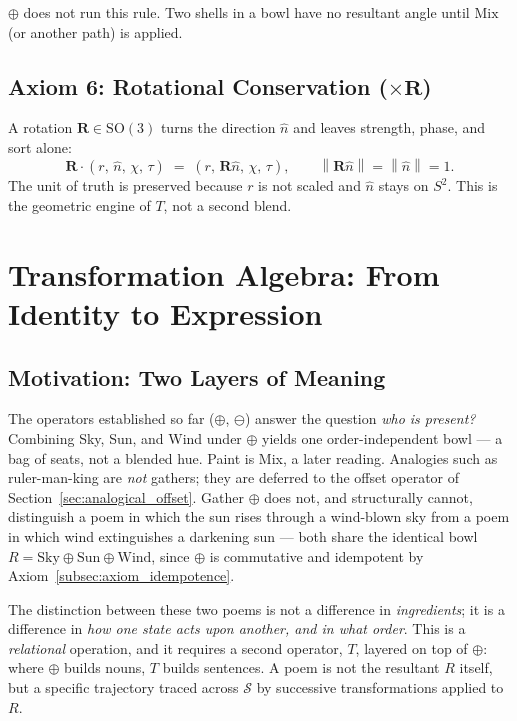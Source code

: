 \documentclass[12pt, a4paper]{article}
\providecommand{\norm}[1]{\left\lVert#1\right\rVert}
\begin{document}
$\oplus$ does not run this rule. Two shells in a bowl have no
resultant angle until $\mathrm{Mix}$ (or another path) is applied.

\subsection{Axiom 6: Rotational Conservation (\texorpdfstring{$\times \mathbf{R}$}{x R})}
\label{subsec:axiom_rotation}
A rotation $\mathbf{R} \in \mathrm{SO}(3)$ turns the direction $\hat n$ and leaves strength, phase, and sort alone:
\begin{equation}
    \mathbf{R}\cdot(r,\,\hat n,\,\chi,\,\tau)
    \;=\;
    (r,\,\mathbf{R}\hat n,\,\chi,\,\tau),
    \qquad
    \norm{\mathbf{R}\hat n} = \norm{\hat n} = 1.
\end{equation}
The unit of truth is preserved because $r$ is not scaled and $\hat n$ stays on $S^2$. This is the geometric engine of $T$, not a second blend.

\section{Transformation Algebra: From Identity to Expression}
\label{sec:transformation_algebra}

\subsection{Motivation: Two Layers of Meaning}
\label{subsec:transform_motivation}
The operators established so far ($\oplus$, $\ominus$) answer the question
\emph{who is present?} Combining Sky, Sun, and Wind under $\oplus$
yields one order-independent bowl --- a bag of seats, not a blended
hue. Paint is Mix, a later reading. Analogies such as ruler-man-king are \emph{not} gathers; they are deferred to the offset operator of Section~\ref{sec:analogical_offset}. Gather $\oplus$ does not, and structurally
cannot, distinguish a poem in which the sun rises through a wind-blown
sky from a poem in which wind extinguishes a darkening sun --- both
share the identical bowl
$R = \text{Sky} \oplus \text{Sun} \oplus \text{Wind}$, since $\oplus$
is commutative and idempotent by Axiom~\ref{subsec:axiom_idempotence}.

The distinction between these two poems is not a difference in
\emph{ingredients}; it is a difference in \emph{how one state acts
upon another, and in what order}. This is a \emph{relational}
operation, and it requires a second operator, $T$, layered on top of
$\oplus$: where $\oplus$ builds nouns, $T$ builds sentences. A poem is
not the resultant $R$ itself, but a specific trajectory traced across
$\mathcal{S}$ by successive transformations applied to $R$.
\end{document}

